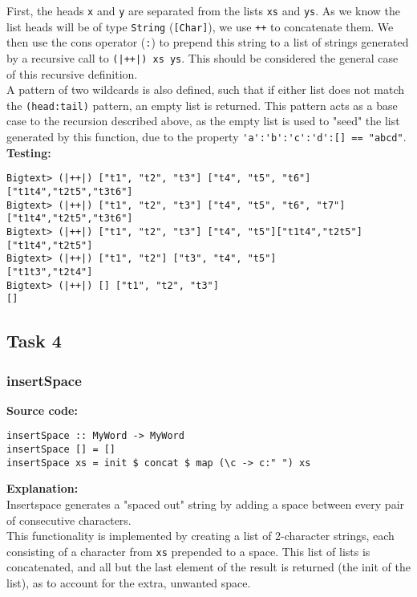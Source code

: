 \documentclass[11pt]{article}
\begin{document}
First, the heads {\verb|x|} and {\verb|y|} are separated from the lists {\verb|xs|} and {\verb|ys|}. As we know the list heads will be of type {\verb|String|} ({\verb|[Char]|}), we use {\verb|++|} to concatenate them. We then use the cons operator ({\verb|:|}) to prepend this string to a list of strings generated by a recursive call to {\verb=(|++|) xs ys=}. This should be considered the general case of this recursive definition. \\

A pattern of two wildcards is also defined, such that if either list does not match the {\verb|(head:tail)|} pattern, an empty list is returned. This pattern acts as a base case to the recursion described above, as the empty list is used to "seed" the list generated by this function, due to the property {\verb|'a':'b':'c':'d':[] == "abcd"|}.\\

\newpage
\textbf{Testing:}
\begin{verbatim}
Bigtext> (|++|) ["t1", "t2", "t3"] ["t4", "t5", "t6"]
["t1t4","t2t5","t3t6"]
Bigtext> (|++|) ["t1", "t2", "t3"] ["t4", "t5", "t6", "t7"]
["t1t4","t2t5","t3t6"]
Bigtext> (|++|) ["t1", "t2", "t3"] ["t4", "t5"]["t1t4","t2t5"]
["t1t4","t2t5"]
Bigtext> (|++|) ["t1", "t2"] ["t3", "t4", "t5"]
["t1t3","t2t4"]
Bigtext> (|++|) [] ["t1", "t2", "t3"]
[]
\end{verbatim}

\subsection{Task 4}
\subsubsection{insertSpace}
\textbf{Source code:}
\begin{verbatim}
insertSpace :: MyWord -> MyWord
insertSpace [] = []                                   
insertSpace xs = init $ concat $ map (\c -> c:" ") xs
\end{verbatim}

\textbf{Explanation:}\\
Insertspace generates a "spaced out" string by adding a space between every pair of consecutive characters. \\

This functionality is implemented by creating a list of 2-character strings, each consisting of a character from {\verb|xs|} prepended to a space. This list of lists is concatenated, and all but the last element of the result is returned (the init of the list), as to account for the extra, unwanted space. \\
\end{document}
